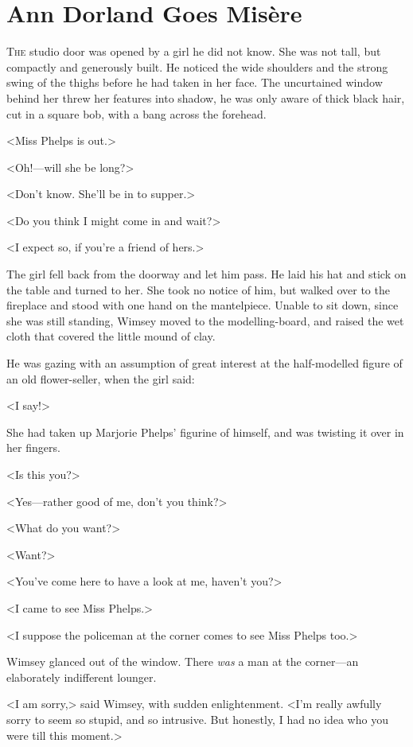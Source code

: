 \chapter{Ann Dorland Goes Misère}

\lettrine{T}{he} studio door was opened by a girl he did not know. She was not tall, but compactly and generously built. He noticed the wide shoulders and the strong swing of the thighs before he had taken in her face. The uncurtained window behind her threw her features into shadow, he was only aware of thick black hair, cut in a square bob, with a bang across the forehead.

<Miss Phelps is out.>

<Oh!—will she be long?>

<Don't know. She'll be in to supper.>

<Do you think I might come in and wait?>

<I expect so, if you're a friend of hers.>

The girl fell back from the doorway and let him pass. He laid his hat and stick on the table and turned to her. She took no notice of him, but walked over to the fireplace and stood with one hand on the mantelpiece. Unable to sit down, since she was still standing, Wimsey moved to the modelling-board, and raised the wet cloth that covered the little mound of clay.

He was gazing with an assumption of great interest at the half-modelled figure of an old flower-seller, when the girl said:

<I say!>

She had taken up Marjorie Phelps' figurine of himself, and was twisting it over in her fingers.

<Is this you?>

<Yes—rather good of me, don't you think?>

<What do you want?>

<Want?>

<You've come here to have a look at me, haven't you?>

<I came to see Miss Phelps.>

<I suppose the policeman at the corner comes to see Miss Phelps too.>

Wimsey glanced out of the window. There \emph{was} a man at the corner—an elaborately indifferent lounger.

<I am sorry,> said Wimsey, with sudden enlightenment. <I'm really awfully sorry to seem so stupid, and so intrusive. But honestly, I had no idea who you were till this moment.>

